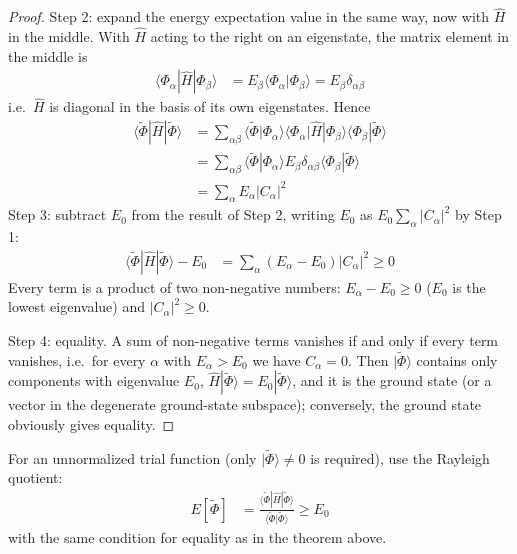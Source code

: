 \begin{proof}
Step 2: expand the energy expectation value in the same way, now with $\hat{H}$ in the middle. With $\hat{H}$ acting to the right on an eigenstate, the matrix element in the middle is
\begin{align*}
\langle \Phi_\alpha|\hat{H}|\Phi_\beta\rangle &= E_\beta \langle \Phi_\alpha|\Phi_\beta\rangle = E_\beta \delta_{\alpha\beta}
\end{align*}
i.e.\ $\hat{H}$ is diagonal in the basis of its own eigenstates. Hence
\begin{align*}
\langle\tilde{\Phi}|\hat{H}|\tilde{\Phi}\rangle &= \sum_{\alpha \beta} \langle\tilde{\Phi}|\Phi_\alpha\rangle\langle\Phi_\alpha|\hat{H}|\Phi_\beta\rangle\langle\Phi_\beta|\tilde{\Phi}\rangle \\
&= \sum_{\alpha \beta} \langle\tilde{\Phi}|\Phi_\alpha\rangle E_\beta \delta_{\alpha \beta} \langle\Phi_\beta|\tilde{\Phi}\rangle \\
&= \sum_{\alpha} E_\alpha |C_\alpha|^2
\end{align*}
Step 3: subtract $E_0$ from the result of Step 2, writing $E_0$ as $E_0 \sum_\alpha |C_\alpha|^2$ by Step 1:
\begin{align*}
\langle\tilde{\Phi}|\hat{H}|\tilde{\Phi}\rangle - E_0 &= \sum_\alpha (E_\alpha - E_0) |C_\alpha|^2 \ge 0
\end{align*}
Every term is a product of two non-negative numbers: $E_\alpha - E_0 \ge 0$ ($E_0$ is the lowest eigenvalue) and $|C_\alpha|^2 \ge 0$.

Step 4: equality. A sum of non-negative terms vanishes if and only if every term vanishes, i.e.\ for every $\alpha$ with $E_\alpha > E_0$ we have $C_\alpha = 0$. Then $|\tilde{\Phi}\rangle$ contains only components with eigenvalue $E_0$, $\hat{H} |\tilde{\Phi}\rangle = E_0 |\tilde{\Phi}\rangle$, and it is the ground state (or a vector in the degenerate ground-state subspace); conversely, the ground state obviously gives equality.
\end{proof}

For an unnormalized trial function (only $|\tilde{\Phi}\rangle \neq 0$ is required), use the Rayleigh quotient:
\begin{align}\label{eq:rayleigh}
E[\tilde{\Phi}] &= \frac{\langle\tilde{\Phi}|\hat{H}|\tilde{\Phi}\rangle}{\langle\tilde{\Phi}|\tilde{\Phi}\rangle} \ge E_0
\end{align}
with the same condition for equality as in the theorem above.

